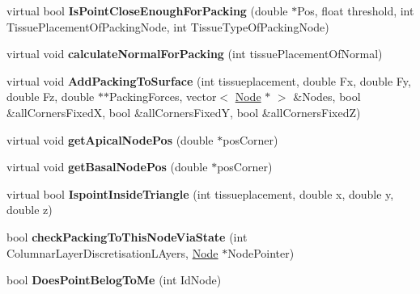\begin{DoxyCompactItemize}
\item 
\hypertarget{classShapeBase_a2182160216e98fb3c07648d4101f9833}{}virtual bool {\bfseries Is\+Point\+Close\+Enough\+For\+Packing} (double $\ast$Pos, float threshold, int Tissue\+Placement\+Of\+Packing\+Node, int Tissue\+Type\+Of\+Packing\+Node)\label{classShapeBase_a2182160216e98fb3c07648d4101f9833}

\item 
\hypertarget{classShapeBase_a81c2b32d9bd860c202c2c18bdaefb46c}{}virtual void {\bfseries calculate\+Normal\+For\+Packing} (int tissue\+Placement\+Of\+Normal)\label{classShapeBase_a81c2b32d9bd860c202c2c18bdaefb46c}

\item 
\hypertarget{classShapeBase_a3d9c7401fa0ffdb2fda0b69fc854f6f3}{}virtual void {\bfseries Add\+Packing\+To\+Surface} (int tissueplacement, double Fx, double Fy, double Fz, double $\ast$$\ast$Packing\+Forces, vector$<$ \hyperlink{classNode}{Node} $\ast$ $>$ \&Nodes, bool \&all\+Corners\+Fixed\+X, bool \&all\+Corners\+Fixed\+Y, bool \&all\+Corners\+Fixed\+Z)\label{classShapeBase_a3d9c7401fa0ffdb2fda0b69fc854f6f3}

\item 
\hypertarget{classShapeBase_a8e70b4b3be96de765028face345ad73d}{}virtual void {\bfseries get\+Apical\+Node\+Pos} (double $\ast$pos\+Corner)\label{classShapeBase_a8e70b4b3be96de765028face345ad73d}

\item 
\hypertarget{classShapeBase_a5a6237d792984062e576ecdb87e9c75e}{}virtual void {\bfseries get\+Basal\+Node\+Pos} (double $\ast$pos\+Corner)\label{classShapeBase_a5a6237d792984062e576ecdb87e9c75e}

\item 
\hypertarget{classShapeBase_a0afba3fd829971174cd736b45722758c}{}virtual bool {\bfseries Ispoint\+Inside\+Triangle} (int tissueplacement, double x, double y, double z)\label{classShapeBase_a0afba3fd829971174cd736b45722758c}

\item 
\hypertarget{classShapeBase_a4d7bfb4ed03b7633e02e753a485fbf01}{}bool {\bfseries check\+Packing\+To\+This\+Node\+Via\+State} (int Columnar\+Layer\+Discretisation\+L\+Ayers, \hyperlink{classNode}{Node} $\ast$Node\+Pointer)\label{classShapeBase_a4d7bfb4ed03b7633e02e753a485fbf01}

\item 
\hypertarget{classShapeBase_aed4c893952a6afad718a2037e0635296}{}bool {\bfseries Does\+Point\+Belog\+To\+Me} (int Id\+Node)\label{classShapeBase_aed4c893952a6afad718a2037e0635296}


\end{DoxyCompactItemize}
